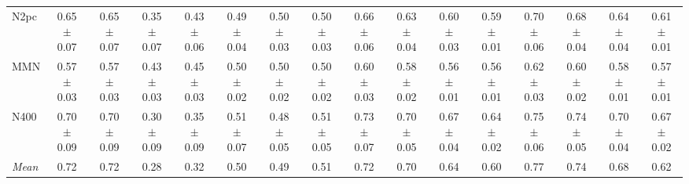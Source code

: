 \begin{table}[t]
\begin{tabular}{lccccccccccccccc}
N2pc & 0.65 $\pm$ 0.07 & 0.65 $\pm$ 0.07 & 0.35 $\pm$ 0.07 & 0.43 $\pm$ 0.06 & 0.49 $\pm$ 0.04 & 0.50 $\pm$ 0.03 & 0.50 $\pm$ 0.03 & 0.66 $\pm$ 0.06 & 0.63 $\pm$ 0.04 & 0.60 $\pm$ 0.03 & 0.59 $\pm$ 0.01 & 0.70 $\pm$ 0.06 & 0.68 $\pm$ 0.04 & 0.64 $\pm$ 0.04 & 0.61 $\pm$ 0.01 \\
MMN & 0.57 $\pm$ 0.03 & 0.57 $\pm$ 0.03 & 0.43 $\pm$ 0.03 & 0.45 $\pm$ 0.03 & 0.50 $\pm$ 0.02 & 0.50 $\pm$ 0.02 & 0.50 $\pm$ 0.02 & 0.60 $\pm$ 0.03 & 0.58 $\pm$ 0.02 & 0.56 $\pm$ 0.01 & 0.56 $\pm$ 0.01 & 0.62 $\pm$ 0.03 & 0.60 $\pm$ 0.02 & 0.58 $\pm$ 0.01 & 0.57 $\pm$ 0.01 \\
N400 & 0.70 $\pm$ 0.09 & 0.70 $\pm$ 0.09 & 0.30 $\pm$ 0.09 & 0.35 $\pm$ 0.09 & 0.51 $\pm$ 0.07 & 0.48 $\pm$ 0.05 & 0.51 $\pm$ 0.05 & 0.73 $\pm$ 0.07 & 0.70 $\pm$ 0.05 & 0.67 $\pm$ 0.04 & 0.64 $\pm$ 0.02 & 0.75 $\pm$ 0.06 & 0.74 $\pm$ 0.05 & 0.70 $\pm$ 0.04 & 0.67 $\pm$ 0.02 \\
\midrule
\textit{Mean} & 0.72 & 0.72 & 0.28 & 0.32 & 0.50 & 0.49 & 0.51 & 0.72 & 0.70 & 0.64 & 0.60 & 0.77 & 0.74 & 0.68 & 0.62 \\
\bottomrule
\end{tabular}
\end{table}
